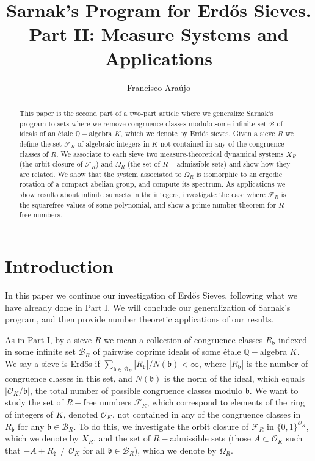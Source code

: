 \documentclass[a4paper,11pt,reqno]{amsart}
\author{Francisco Araújo}
\title{Sarnak's Program for Erd\H{o}s Sieves. Part II: Measure Systems and Applications}
\theoremstyle{plain}
\theoremstyle{remark}
\newcommand{\q}{\mathbb{Q}}
\newcommand{\cb}{\mathcal{B}}
\newcommand{\co}{\mathcal{O}}
\newcommand{\fr}{\mathcal{F}_R}
\newcommand{\gb}{\mathfrak{b}}
\begin{document}
	
	\begin{abstract}
		This paper is the second part of a two-part article where we generalize Sarnak's program to sets where we remove congruence classes modulo some infinite set $\mathcal{B}$ of ideals of an étale $\mathbb{Q}-$algebra $K$, which we denote by Erdős sieves. Given a sieve $R$ we define the set $\mathcal{F}_R$ of algebraic integers in $K$ not contained in any of the congruence classes of $R$. We associate to each sieve two measure-theoretical dynamical systems $X_R$ (the orbit closure of $\mathcal{F}_R$) and $\Omega_R$ (the set of $R-$admissible sets) and show how they are related. We show that the system associated to $\Omega_R$ is isomorphic to an ergodic rotation of a compact abelian group, and compute its spectrum. As applications we show results about infinite sumsets in the integers, investigate the case where $\mathcal{F}_R$ is the squarefree values of some polynomial, and show a prime number theorem for $R-$free numbers. 
	\end{abstract}
	
	\maketitle
	

	
	\section{Introduction}
	
	In this paper we continue our investigation of Erdős Sieves, following what we have already done in Part I. We will conclude our generalization of Sarnak's program, and then provide number theoretic applications of our results.
	
	As in Part I, by a sieve $R$ we mean a collection of congruence classes $R_\gb$ indexed in some infinite set $\cb_R$ of pairwise coprime ideals of some étale $\q-$algebra $K$. We say a sieve is Erdős if $\sum_{\gb \in \cb_R}|R_\gb|/N(\gb)<\infty$, where $|R_\gb|$ is the number of congruence classes in this set, and $N(\gb)$ is the norm of the ideal, which equals $|\co_K/\gb|$, the total number of possible congruence classes modulo $\gb$.  We want to study the set of $R-$free numbers $\fr$, which correspond to elements of the ring of integers of $K$, denoted  $\co_K$,  not contained in any of the congruence classes in $R_\gb$ for any $\gb \in \cb_R$. To do this, we investigate the orbit closure of $\fr$ in $\{0,1\}^{\co_K}$, which we denote by $X_R$, and the set of $R-$admissible sets (those $A\subset \co_K$ such that $-A+R_\gb \neq \co_K$ for all $\gb \in \cb_R$), which we denote by $\Omega_R$. 
	
\end{document}
